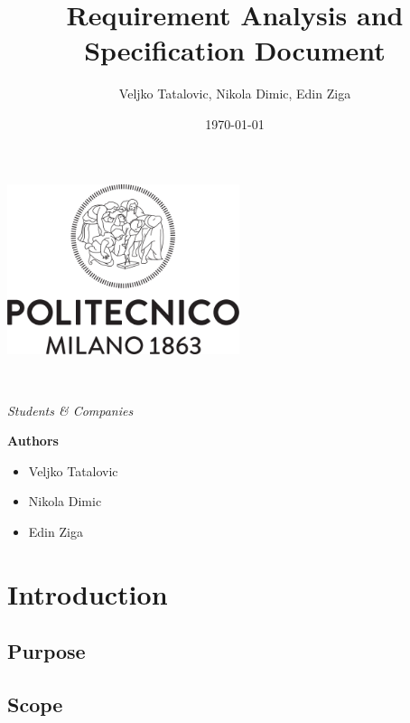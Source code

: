 \documentclass[a4paper,oneside,11pt]{article}
\title{Requirement Analysis and Specification Document}
\author{Veljko Tatalovic, Nikola Dimic, Edin Ziga}
\date{\today}
\begin{document}
    \begin{titlingpage} 
        \begin{center}
            \includegraphics[height=5cm]{assets/Logo_Politecnico_Milano.png}\\
            \vspace{4cm}
            \begin{huge} 
                \textbf{\thetitle} \\
            \end{huge}
            \vspace{0.3cm}
            \begin{Large}
                \textit{Students \& Companies} \\
            \end{Large}
        \end{center}

            \vspace{4cm}
             \begin{large}
            \textbf{Authors}
            \begin{itemize}
                \item Veljko Tatalovic 
                \item Nikola Dimic
                \item Edin Ziga
            \end{itemize}
        \end{large}
    \end{titlingpage}
    \newpage
    \tableofcontents
    \newpage
    \section{Introduction}
    
        \subsection{Purpose}
            
        \subsection{Scope}
            
\end{document}
